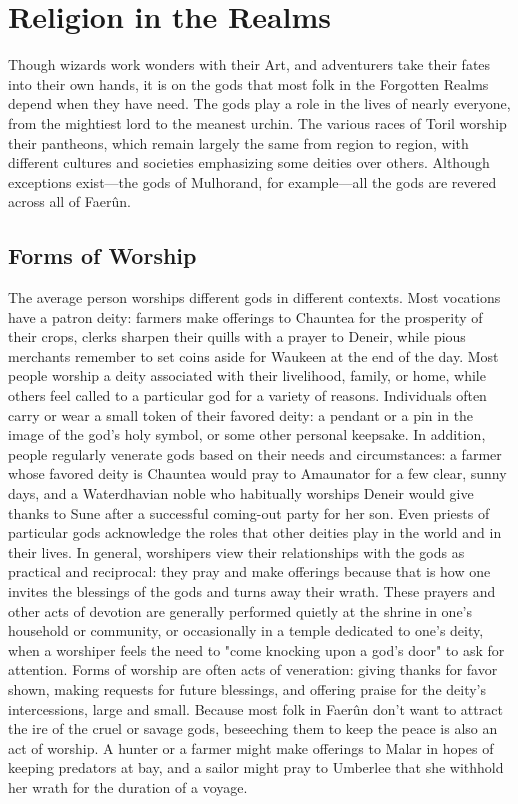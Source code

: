 \documentclass[10pt,a4paper,twoside,twocolumn,openany,bg=print,nodeprecatedcode]{dndbook}
\begin{document}
\section{Religion in the Realms}
Though wizards work wonders with their Art, and adventurers take their fates into their own hands, it is on the gods that most folk in the Forgotten Realms depend when they have need. The gods play a role in the lives of nearly everyone, from the mightiest lord to the meanest urchin.
The various races of Toril worship their pantheons, which remain largely the same from region to region, with different cultures and societies emphasizing some deities over others. Although exceptions exist—the gods of Mulhorand, for example—all the gods are revered across all of Faerûn.
\subsection{Forms of Worship}
The average person worships different gods in different contexts. Most vocations have a patron deity: farmers make offerings to Chauntea for the prosperity of their crops, clerks sharpen their quills with a prayer to Deneir, while pious merchants remember to set coins aside for Waukeen at the end of the day. Most people worship a deity associated with their livelihood, family, or home, while others feel called to a particular god for a variety of reasons. Individuals often carry or wear a small token of their favored deity: a pendant or a pin in the image of the god's holy symbol, or some other personal keepsake.
In addition, people regularly venerate gods based on their needs and circumstances: a farmer whose favored deity is Chauntea would pray to Amaunator for a few clear, sunny days, and a Waterdhavian noble who habitually worships Deneir would give thanks to Sune after a successful coming-out party for her son. Even priests of particular gods acknowledge the roles that other deities play in the world and in their lives.
In general, worshipers view their relationships with the gods as practical and reciprocal: they pray and make offerings because that is how one invites the blessings of the gods and turns away their wrath. These prayers and other acts of devotion are generally performed quietly at the shrine in one's household or community, or occasionally in a temple dedicated to one's deity, when a worshiper feels the need to "come knocking upon a god's door" to ask for attention.
Forms of worship are often acts of veneration: giving thanks for favor shown, making requests for future blessings, and offering praise for the deity's intercessions, large and small. Because most folk in Faerûn don't want to attract the ire of the cruel or savage gods, beseeching them to keep the peace is also an act of worship. A hunter or a farmer might make offerings to Malar in hopes of keeping predators at bay, and a sailor might pray to Umberlee that she withhold her wrath for the duration of a voyage.
\end{document}
